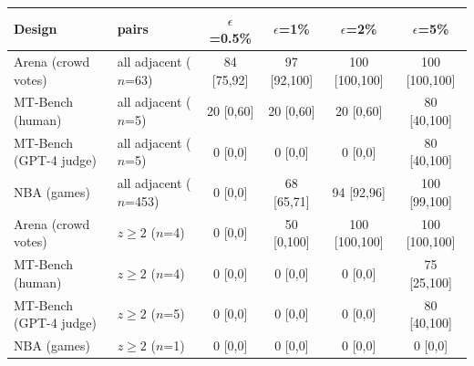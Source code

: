 \begin{tabular}{llcccc}\toprule
 Design & pairs & $\epsilon$=0.5\% & $\epsilon$=1\% & $\epsilon$=2\% & $\epsilon$=5\% \\\midrule
Arena (crowd votes) & all adjacent ($n$=63) & 84 [75,92] & 97 [92,100] & 100 [100,100] & 100 [100,100] \\
MT-Bench (human) & all adjacent ($n$=5) & 20 [0,60] & 20 [0,60] & 20 [0,60] & 80 [40,100] \\
MT-Bench (GPT-4 judge) & all adjacent ($n$=5) & 0 [0,0] & 0 [0,0] & 0 [0,0] & 80 [40,100] \\
NBA (games) & all adjacent ($n$=453) & 0 [0,0] & 68 [65,71] & 94 [92,96] & 100 [99,100] \\
\midrule
Arena (crowd votes) & $z\geq2$ ($n$=4) & 0 [0,0] & 50 [0,100] & 100 [100,100] & 100 [100,100] \\
MT-Bench (human) & $z\geq2$ ($n$=4) & 0 [0,0] & 0 [0,0] & 0 [0,0] & 75 [25,100] \\
MT-Bench (GPT-4 judge) & $z\geq2$ ($n$=5) & 0 [0,0] & 0 [0,0] & 0 [0,0] & 80 [40,100] \\
NBA (games) & $z\geq2$ ($n$=1) & 0 [0,0] & 0 [0,0] & 0 [0,0] & 0 [0,0] \\
\bottomrule\end{tabular}

